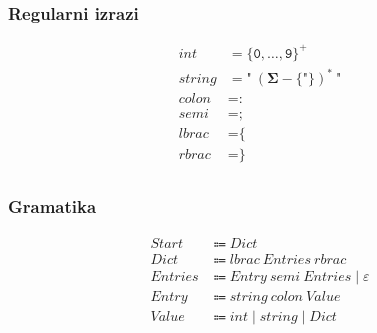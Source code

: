 \documentclass{report}
\newcommand{\Null}{\varepsilon}
\newcommand{\Char}[1]{\texttt{#1}}
\newcommand{\Spc}{\ }
\newcommand{\Union}{\mathrel{|}}
\newcommand{\Kleene}[1]{{#1}^\ast}
\newcommand{\KleenePlus}[1]{#1^+}
\newcommand{\Set}[1]{\symbf{#1}}
\newcommand{\Alphabet}{\Set{\Sigma}}
\newcommand{\Arrow}{\Coloneq}
\newcommand{\NT}[1]{{#1}}
\newcommand{\T}[1]{{#1}}
\begin{document}
    \subsubsection*{Regularni izrazi}
    \begin{equation*}
      \begin{aligned}
        \T{int} &= \KleenePlus{\{\Char{0}, \dots, \Char{9}\}}\\
        \T{string} &= \Char{"} \Spc \Kleene{(\Alphabet - \{\Char{"}\})} \Spc \Char{"}\\
        \T{colon} &= \Char{:}\\
        \T{semi} &= \Char{;}\\
        \T{lbrac} &= \Char{\{}\\
        \T{rbrac} &= \Char{\}}\\
      \end{aligned}
    \end{equation*}

    \subsubsection*{Gramatika}
    \begin{equation*}
      \begin{aligned}
        \NT{Start} &\Arrow \NT{Dict}\\
        \NT{Dict} &\Arrow \T{lbrac} \Spc \NT{Entries} \Spc \T{rbrac}\\
        \NT{Entries} &\Arrow \NT{Entry} \Spc \T{semi} \Spc \NT{Entries} \Union \Null\\
        \NT{Entry} &\Arrow \T{string} \Spc \T{colon} \Spc \NT{Value}\\
        \NT{Value} &\Arrow \T{int} \Union \T{string} \Union \NT{Dict}
      \end{aligned}
    \end{equation*}
\end{document}
